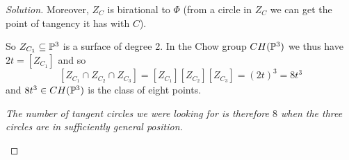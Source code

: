 \begin{proof}[Solution]
Moreover, $Z_C$ is birational to $\Phi$ (from a circle in $Z_C$ we can get the point of tangency it has with $C$).

So $Z_{C_1}\subseteq\mathbb{P}^3$ is a surface of degree 2. In the Chow group $CH(\mathbb{P}^3)$ we thus have $2t=[Z_{C_1}]$ and so
\[[Z_{C_1}\cap Z_{C_2}\cap Z_{C_3}]=[Z_{C_1}][Z_{C_2}][Z_{C_3}]=(2t)^3=8t^3\]
and $8t^3\in CH(\mathbb{P}^3)$ is the class of eight points.

\begin{center}
	\textit{The number of tangent circles we were looking for is therefore $8$ when the three circles are in sufficiently general position.}
\end{center}
\end{proof}
















